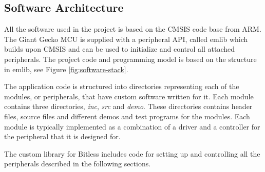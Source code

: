 \subsection{Software Architecture}

All the software used in the project is based on the CMSIS \cite{cmsisapi} code base from
ARM. The Giant Gecko MCU is supplied with a peripheral API,
called emlib \cite{emlibapi} which builds upon CMSIS and can be
used to initialize and control all attached peripherals. The project code and
programming model is based on the structure in emlib, 
see Figure \ref{fig:software-stack}.



The application code is structured into directories representing each of the
modules, or peripherals, that have custom software written for it. Each module
contains three directories, \textit{inc}, \textit{src} and \textit{demo}.
These directories contains header files, source files and different demos and
test programs for the modules. Each module is typically
implemented as a combination of a driver and a controller for the 
peripheral that it is designed for.

The custom library for Bitless includes code for setting up and controlling
all the peripherals described in the following sections. 